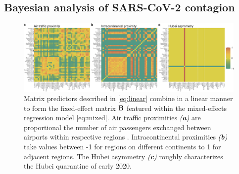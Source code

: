 \documentclass[12pt]{article} %
\begin{document}
\subsection{Bayesian analysis of SARS-CoV-2 contagion}\label{sec:sars}

\begin{figure}[!t]
	\centering
	\includegraphics[width=\linewidth]{fixedEffects.pdf}
	\vspace{-2em}
	\caption{Matrix predictors described in \eqref{eq:linear} combine in a linear manner to form the fixed-effect matrix $\mathbf{B}$ featured within the mixed-effects regression model \eqref{eq:mixed}.  Air traffic proximities \emph{(\textbf{a})} are proportional the number of air passengers exchanged between airports within respective regions \citep{holbrook2021massive}.  Intracontinental proximities \emph{(\textbf{b})} take values between -1 for regions on different continents to 1 for adjacent regions.  The Hubei asymmetry \emph{(\textbf{c})} roughly characterizes the Hubei quarantine of early 2020.}\label{fig:FE}
\end{figure}
\end{document}
